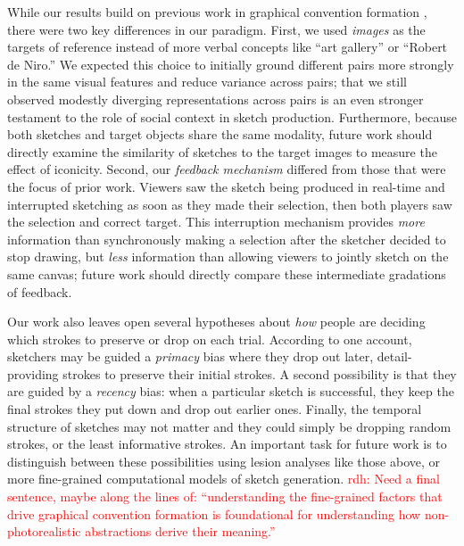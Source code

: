 \documentclass[10pt,letterpaper]{article}
\newcommand{\rdh}[1]{\textcolor{Red}{rdh: #1}}
\begin{document}
While our results build on previous work in graphical convention formation \cite{garrod_foundations_2007,fay2010interactive}, there were two key differences in our paradigm. 
First, we used \emph{images} as the targets of reference instead of more verbal concepts like ``art gallery'' or ``Robert de Niro.''  
We expected this choice to initially ground different pairs more strongly in the same visual features and reduce variance across pairs; that we still observed modestly diverging representations across pairs is an even stronger testament  to the role of social context in sketch production.
Furthermore, because both sketches and target objects share the same modality, future work should directly examine the similarity of sketches to the target images to measure the effect of iconicity.
Second, our \emph{feedback mechanism} differed from those that were the focus of prior work.
Viewers saw the sketch being produced in real-time and interrupted sketching as soon as they made their selection, then both players saw the selection and correct target.
This interruption mechanism provides \emph{more} information than synchronously making a selection after the sketcher decided to stop drawing, but \emph{less} information than allowing viewers to jointly sketch on the same canvas; future work should directly compare these intermediate gradations of feedback.

Our work also leaves open several hypotheses about \emph{how} people are deciding which strokes to preserve or drop on each trial. 
According to one account, sketchers may be guided a \emph{primacy} bias where they drop out later, detail-providing strokes to preserve their initial strokes.
A second possibility is that they are guided by a \emph{recency} bias: when a particular sketch is successful, they keep the final strokes they put down and drop out earlier ones.
Finally, the temporal structure of sketches may not matter and they could simply be dropping random strokes, or the least informative strokes. 
An important task for future work is to distinguish between these possibilities using lesion analyses like those above, or more fine-grained computational models of sketch generation.
\rdh{Need a final sentence, maybe along the lines of: ``understanding the fine-grained factors that drive graphical convention formation is foundational for understanding how non-photorealistic abstractions derive their meaning.''}
\end{document}
